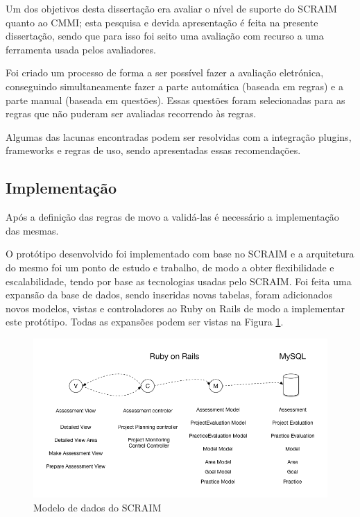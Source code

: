 \documentclass[9pt,a4paper]{extarticle}
\begin{document}
\begin{multicols}{2}
Um dos objetivos desta dissertação era avaliar o nível de suporte do SCRAIM quanto ao CMMI; esta pesquisa e devida apresentação é feita na presente dissertação, sendo que para isso foi seito uma avaliação com recurso a uma ferramenta usada pelos avaliadores.

Foi criado um processo de forma a ser possível fazer a avaliação eletrónica, conseguindo simultaneamente fazer a parte automática (baseada em regras) e a parte manual (baseada em questões). Essas questões foram selecionadas para as regras que não puderam ser avaliadas recorrendo às regras.

Algumas das lacunas encontradas podem ser resolvidas com a integração plugins, frameworks e regras de uso, sendo apresentadas essas recomendações.


\subsection{Implementação}
Após a definição das regras de movo a validá-las é necessário a implementação das mesmas.

O protótipo desenvolvido foi implementado com base no SCRAIM e a arquitetura do mesmo foi um ponto de estudo e trabalho, de modo a obter flexibilidade e escalabilidade, tendo por base as tecnologias usadas pelo SCRAIM.
Foi feita uma expansão da base de dados, sendo inseridas novas tabelas, foram adicionados novos modelos, vistas e controladores ao Ruby on Rails de modo a implementar este protótipo. Todas as expansões podem ser vistas na Figura \ref{fig:figura}.

\begin{figure}[H]
	\centerline{\includegraphics[scale=.3]{presentation.png}}
	\caption{Modelo de dados do SCRAIM}  
	\label{fig:figura}
\end{figure}


\end{multicols}
\end{document}
